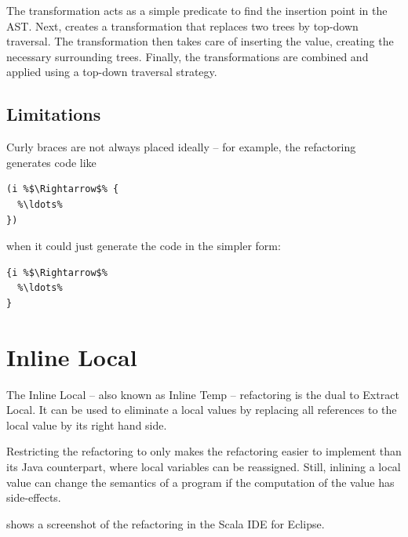 \documentclass[10pt,a4paper,oneside]{scrreprt}
\begin{document}
The  transformation acts as a simple predicate to find the insertion point in the AST. Next,  creates a transformation that replaces two trees by top-down traversal. The  transformation then takes care of inserting the value, creating the necessary surrounding  trees. Finally, the transformations are combined and applied using a top-down traversal strategy.

\subsection{Limitations}

Curly braces are not always placed ideally -- for example, the refactoring generates code like 

\begin{lstlisting}
(i %$\Rightarrow$% {
  %\ldots%
})
\end{lstlisting}

when it could just generate the code in the simpler form:
\begin{lstlisting}
{i %$\Rightarrow$%
  %\ldots%
}
\end{lstlisting}

\section{Inline Local}

The Inline Local -- also known as Inline Temp -- refactoring is the dual to Extract Local. It can be used to eliminate a local values by replacing all references to the local value by its right hand side.

Restricting the refactoring to  only makes the refactoring easier to implement than its Java counterpart, where local variables can be reassigned. Still, inlining a local value can change the semantics of a program if the computation of the value has side-effects.

 shows a screenshot of the refactoring in the Scala IDE for Eclipse.
\end{document}
